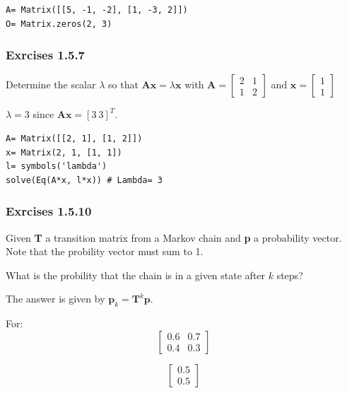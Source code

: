 \begin{verbatim}
A= Matrix([[5, -1, -2], [1, -3, 2]])
O= Matrix.zeros(2, 3)
\end{verbatim}


\subsubsection{Exrcises 1.5.7}

Determine the scalar $\lambda$ so that $\mathbf{Ax} = \lambda \mathbf{x}$ with
$\mathbf{A} = \left[\begin{matrix}2 & 1 \\ 1 & 2\end{matrix}\right]$ and $\mathbf{x} = \left[\begin{matrix} 1\\1 \end{matrix}\right]$

$\lambda = 3$ since $\mathbf{Ax} = [3\ 3]^T$.

\begin{verbatim}
A= Matrix([[2, 1], [1, 2]])
x= Matrix(2, 1, [1, 1])
l= symbols('lambda')
solve(Eq(A*x, l*x)) # Lambda= 3
\end{verbatim}

\subsubsection{Exrcises 1.5.10}

Given \textbf{T} a transition matrix from a Markov chain and \textbf{p} a
probability vector. Note that the probility vector must sum to 1.

What is the probility that the chain is in a given state after $k$ steps?

The answer is given by $\mathbf{p}_k = \mathbf{T}^k\mathbf{p}$.

For:
\begin{equation}
\left[\begin{matrix}0.6 & 0.7\\0.4 & 0.3\end{matrix}\right]
\end{equation}

\begin{equation}
\left[\begin{matrix}0.5\\0.5\end{matrix}\right]
\end{equation}

